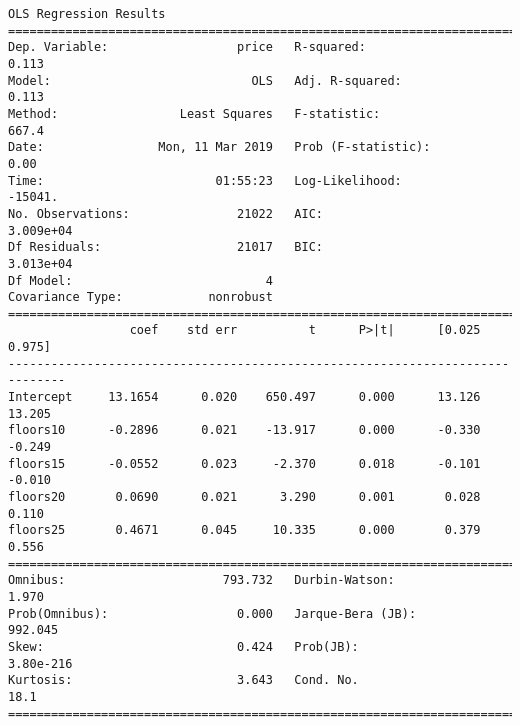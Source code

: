 \documentclass[11pt]{article}
\begin{document}
    \begin{Verbatim}[commandchars=\\\{\}]
                            OLS Regression Results                            
==============================================================================
Dep. Variable:                  price   R-squared:                       0.113
Model:                            OLS   Adj. R-squared:                  0.113
Method:                 Least Squares   F-statistic:                     667.4
Date:                Mon, 11 Mar 2019   Prob (F-statistic):               0.00
Time:                        01:55:23   Log-Likelihood:                -15041.
No. Observations:               21022   AIC:                         3.009e+04
Df Residuals:                   21017   BIC:                         3.013e+04
Df Model:                           4                                         
Covariance Type:            nonrobust                                         
==============================================================================
                 coef    std err          t      P>|t|      [0.025      0.975]
------------------------------------------------------------------------------
Intercept     13.1654      0.020    650.497      0.000      13.126      13.205
floors10      -0.2896      0.021    -13.917      0.000      -0.330      -0.249
floors15      -0.0552      0.023     -2.370      0.018      -0.101      -0.010
floors20       0.0690      0.021      3.290      0.001       0.028       0.110
floors25       0.4671      0.045     10.335      0.000       0.379       0.556
==============================================================================
Omnibus:                      793.732   Durbin-Watson:                   1.970
Prob(Omnibus):                  0.000   Jarque-Bera (JB):              992.045
Skew:                           0.424   Prob(JB):                    3.80e-216
Kurtosis:                       3.643   Cond. No.                         18.1
==============================================================================


\end{Verbatim}
\end{document}
